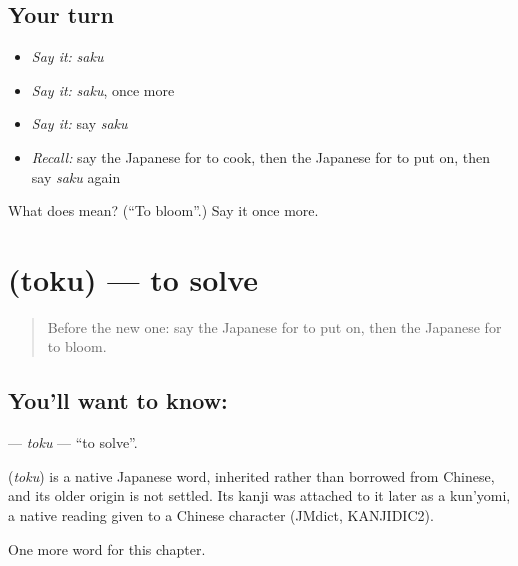 \subsection*{Your turn}
\begin{itemize}
\raggedright
  \item \emph{Say it:} \emph{saku}
  \item \emph{Say it:} \emph{saku}, once more
  \item \emph{Say it:} say \emph{saku}
  \item \emph{Recall:} say the Japanese for to cook, then the Japanese for to put on, then say \emph{saku} again
\end{itemize}

\begin{tcolorbox}[breakable,colback=teal!4,colframe=teal!35!black,title={Before you move on}]
What does  mean? (\textquotedblleft{}To bloom\textquotedblright{}.) Say it once more.
\end{tcolorbox}
\section[\texorpdfstring{\ja{とく} (toku)}{とく (toku)}]{ (toku) — to solve}

\label{lesson:JA-C86-toku}



\begin{quote}
Before the new one: say the Japanese for to put on, then the Japanese for to bloom.
\end{quote}

\subsection*{You'll want to know: }
\textbf{} — \emph{toku} — \textquotedblleft{}to solve\textquotedblright{}.

\begin{cousinweb}
\textbf{} (\emph{toku}) is a native Japanese word, inherited rather than borrowed from Chinese, and its older origin is not settled. Its kanji was attached to it later as a kun'yomi, a native reading given to a Chinese character (JMdict, KANJIDIC2).
\end{cousinweb}

\begin{grammarlens}[title={What you've built}]
One more word for this chapter.
\end{grammarlens}

